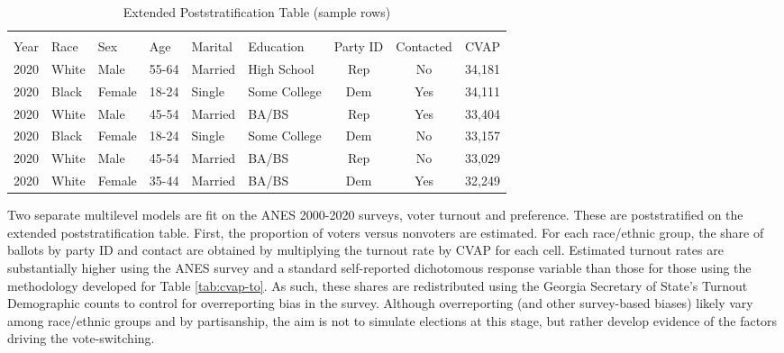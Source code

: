 \begin{table}[H]
\centering
\caption{Extended Poststratification Table (sample rows)}
\label{tab:twice-ps}
\begin{threeparttable}
\begin{tabular}{rlllllccr}
  \hline \\ \vspace{0.5em} 
Year & Race & Sex & Age & Marital & Education & Party ID & Contacted & CVAP \\ 
  \hline
2020 & White & Male & 55-64 & Married & High School & Rep & No  &34,181 \\ 
  2020 & Black & Female & 18-24 & Single & Some College & Dem & Yes& 34,111\\ 
  2020 & White & Male & 45-54 & Married & BA/BS & Rep & Yes &33,404\\ 
  2020 & Black & Female & 18-24 & Single & Some College & Dem & No&33,157 \\ 
  2020 & White & Male & 45-54 & Married & BA/BS & Rep & No& 33,029 \\ 
  2020 & White & Female & 35-44 & Married & BA/BS & Dem & Yes&  32,249\\ 
  \hline
\end{tabular}
\end{threeparttable}
\end{table}

Two separate multilevel models are fit on the ANES 2000-2020 surveys, voter turnout and preference. These are poststratified on the extended poststratification table. First, the proportion of voters versus nonvoters are estimated. For each race/ethnic group, the share of ballots by party ID and contact are obtained by multiplying the turnout rate by CVAP for each cell. Estimated turnout rates are substantially higher using the ANES survey and a standard self-reported dichotomous response variable than those for those using the methodology developed for Table \ref{tab:cvap-to}. As such, these shares are redistributed using the Georgia Secretary of State's Turnout Demographic counts to control for overreporting bias in the survey. Although overreporting (and other survey-based biases) likely vary among race/ethnic groups and by partisanship, the aim is not to simulate elections at this stage, but rather develop evidence of the factors driving the vote-switching. 

